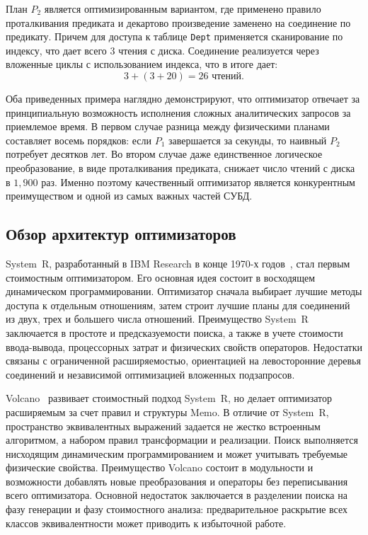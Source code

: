 \documentclass[14pt, russian]{scrartcl}
\begin{document}
План \(P_2\) является оптимизированным вариантом, где применено правило
проталкивания предиката и декартово произведение заменено на соединение по
предикату. Причем для доступа к таблице \texttt{Dept} применяется сканирование
по индексу, что дает всего \(3\) чтения с диска. Соединение реализуется через
вложенные циклы с использованием индекса, что в итоге дает:
\[
  3 + (3 + 20) = 26 \text{ чтений.}
\]

Оба приведенных примера наглядно демонстрируют, что оптимизатор отвечает за
принципиальную возможность исполнения сложных аналитических запросов за
приемлемое время. В первом случае разница между физическими планами составляет
восемь порядков: если \(P_1\) завершается за секунды, то наивный \(P_2\)
потребует десятков лет. Во втором случае даже единственное логическое
преобразование, в виде проталкивания предиката, снижает число чтений с диска в
\(1{,}900\) раз. Именно поэтому качественный оптимизатор является конкурентным
преимуществом и одной из самых важных частей СУБД.

\subsection{Обзор архитектур оптимизаторов}

System~R, разработанный в IBM Research в конце 1970-х годов~\cite{Selinger1979},
стал первым стоимостным оптимизатором. Его основная идея состоит в восходящем
динамическом программировании. Оптимизатор сначала выбирает лучшие методы
доступа к отдельным отношениям, затем строит лучшие планы для соединений из
двух, трех и большего числа отношений. Преимущество System~R заключается в
простоте и предсказуемости поиска, а также в учете стоимости ввода-вывода,
процессорных затрат и физических свойств операторов. Недостатки связаны с
ограниченной расширяемостью, ориентацией на левосторонние деревья соединений и
независимой оптимизацией вложенных подзапросов.

Volcano~\cite{GraefeMcKenna1993,graefe2002volcano,Begoli2018Calcite} развивает
стоимостный подход System~R, но делает оптимизатор расширяемым за счет правил и
структуры Memo. В отличие от System~R, пространство эквивалентных выражений
задается не жестко встроенным алгоритмом, а набором правил трансформации и
реализации. Поиск выполняется нисходящим динамическим программированием и может
учитывать требуемые физические свойства. Преимущество Volcano состоит в
модульности и возможности добавлять новые преобразования и операторы без
переписывания всего оптимизатора. Основной недостаток заключается в разделении
поиска на фазу генерации и фазу стоимостного анализа: предварительное раскрытие
всех классов эквивалентности может приводить к избыточной работе.
\end{document}
